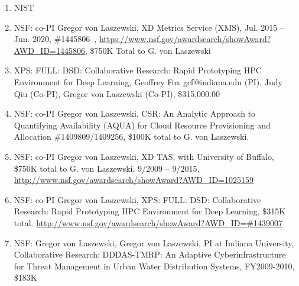 \documentclass{article}
\begin{document}
\begin{enumerate}


\item{NIST}
  
\item  NSF: co-PI Gregor von Laszewski, XD Metrics Service (XMS), Jul. 2015 – Jun. 2020, \#1445806 , \url{https://www.nsf.gov/awardsearch/showAward?AWD_ID=1445806}, \$750K Total to G. von Laszewski
\item   XPS: FULL: DSD: Collaborative Research: Rapid Prototyping HPC Environment for Deep Learning, Geoffrey Fox gcf@indiana.edu (PI), Judy Qiu (Co-PI), Gregor von Laszewski (Co-PI), 	\$315,000.00
\item  NSF: co-PI Gregor von Laszewski, CSR: An Analytic Approach to Quantifying Availability (AQUA) for Cloud Resource Provisioning and Allocation \#1409809/1409256, \$100K total to G. von Laszewski. 

\item  NSF: co-PI Gregor von Laszewski, XD TAS, with University of Buffalo, \$750K total to G. von Laszewski, 9/2009 – 9/2015, \url{http://www.nsf.gov/awardsearch/showAward?AWD_ID=1025159}

\item  NSF: co-PI Gregor von Laszewski, XPS: FULL: DSD: Collaborative Research: Rapid Prototyping HPC Environment for Deep Learning, \$315K total.
  \url{http://www.nsf.gov/awardsearch/showAward?AWD_ID=\#1439007}

\item  NSF: Gregor von Laszewski, Gregor von Laszewski, PI at Indiana University, Collaborative Research: DDDAS-TMRP: An Adaptive Cyberinfrastructure for Threat Management in Urban Water Distribution Systems, FY2009-2010, \$183K
  

\end{enumerate}
\end{document}
